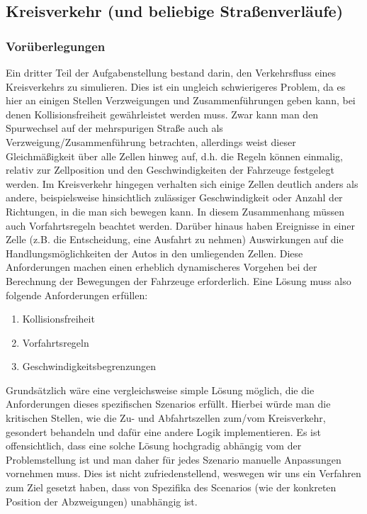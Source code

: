 \documentclass[10pt, a4paper]{article}
\begin{document}
\subsection{Kreisverkehr (und beliebige Straßenverläufe)}
\label{subsec:umsetzung-kreisverkehr}

\subsubsection{Vorüberlegungen}
\label{subsubsec:kreisverkehrUmsetzungVorueberlegungen}

Ein dritter Teil der Aufgabenstellung bestand darin, den Verkehrsfluss eines Kreisverkehrs zu simulieren. Dies ist ein ungleich schwierigeres Problem, da es hier an einigen Stellen Verzweigungen und Zusammenführungen geben kann, bei denen Kollisionsfreiheit gewährleistet werden muss. Zwar kann man den Spurwechsel auf der mehrspurigen Straße auch als Verzweigung/Zusammenführung betrachten, allerdings weist dieser Gleichmäßigkeit über alle Zellen hinweg auf, d.h. die Regeln können einmalig, relativ zur Zellposition und den Geschwindigkeiten der Fahrzeuge festgelegt werden. Im Kreisverkehr hingegen verhalten sich einige Zellen deutlich anders als andere, beispielsweise hinsichtlich zulässiger Geschwindigkeit oder Anzahl der Richtungen, in die man sich bewegen kann. In diesem Zusammenhang müssen auch Vorfahrtsregeln beachtet werden. Darüber hinaus haben Ereignisse in einer Zelle (z.B. die Entscheidung, eine Ausfahrt zu nehmen) Auswirkungen auf die Handlungsmöglichkeiten der Autos in den umliegenden Zellen. Diese Anforderungen machen einen erheblich dynamischeres Vorgehen bei der Berechnung der Bewegungen der Fahrzeuge erforderlich. Eine Lösung muss also folgende Anforderungen erfüllen:

\begin{enumerate}
	\item Kollisionsfreiheit
	\item Vorfahrtsregeln
	\item Geschwindigkeitsbegrenzungen
\end{enumerate}

Grundsätzlich wäre eine vergleichsweise simple Lösung möglich, die die Anforderungen dieses spezifischen Szenarios erfüllt. Hierbei würde man die kritischen Stellen, wie die Zu- und Abfahrtszellen zum/vom Kreisverkehr, gesondert behandeln und dafür eine andere Logik implementieren. Es ist offensichtlich, dass eine solche Lösung hochgradig abhängig vom der Problemstellung ist und man daher für jedes Szenario manuelle Anpassungen vornehmen muss. Dies ist nicht zufriedenstellend, weswegen wir uns ein Verfahren zum Ziel gesetzt haben, dass von Spezifika des Scenarios (wie der konkreten Position der Abzweigungen) unabhängig ist.
\end{document}
